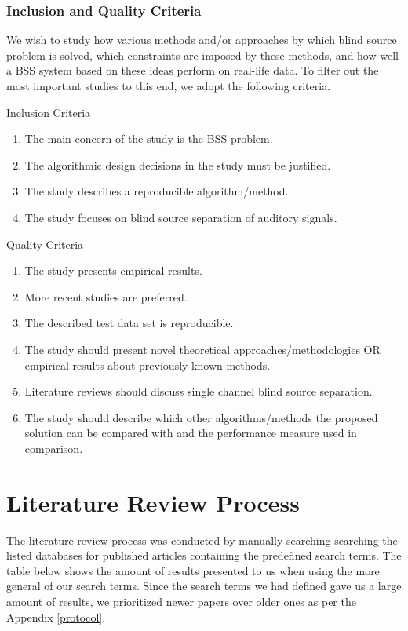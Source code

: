 \documentclass[11pt, oneside, a4paper]{report}
\begin{document}
\subsubsection{Inclusion and Quality Criteria}
We wish to study how various methods and/or approaches by which blind source problem is solved, which constraints are imposed by these methods, and how well a BSS system based on these ideas perform on real-life data. To filter out the most important studies to this end, we adopt the following criteria.

\begin{description}
\item Inclusion Criteria
  \begin{enumerate}
  \item The main concern of the study is the BSS
    problem.
  \item The algorithmic design decisions in the study must be justified.
  \item The study describes a reproducible algorithm/method.
  \item The study focuses on blind source separation of auditory signals.
  \end{enumerate}
\item Quality Criteria
  \begin{enumerate}
  \item The study presents empirical results.
  \item More recent studies are preferred.
  \item The described test data set is
    reproducible.
  \item The study should present novel
    theoretical approaches/methodologies OR
    empirical results about previously known methods. 
  \item Literature reviews should discuss single channel blind source separation.
  \item The study should describe which other algorithms/methods the proposed solution can be compared with and the performance measure used in comparison.
  \end{enumerate}
\end{description}



\section{Literature Review Process}\label{reviewProcess} %
The literature review process was conducted by manually searching searching the listed databases for published articles containing the predefined search terms.
The table below shows the amount of results presented to us when  using the more general of our search terms. Since the search terms we had defined gave us a large amount of results, we prioritized newer papers over older ones as per the Appendix \ref{protocol}.
\end{document}
